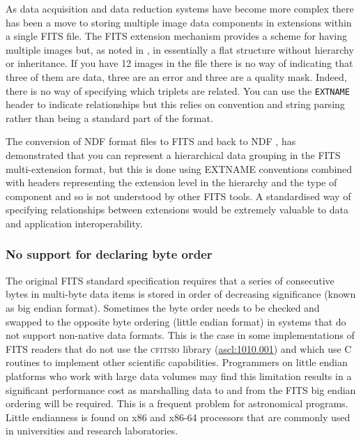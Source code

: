 \documentclass[final,authoryear,5p,times,twocolumn]{elsarticle}
\begin{document}
{{As data acquisition and data reduction systems have become more
complex there has been a move to storing multiple image data
components in extensions within a single FITS file. The FITS extension
mechanism provides a scheme for having multiple images but, as noted
in \citet{2003ASSL..285...71G}, in essentially a flat structure
without hierarchy or inheritance. If you have 12 images in the file
there is no way of indicating that three of them are data, three are an error
and three are a quality mask. Indeed, there is no way of specifying which
triplets are related. You can use the \texttt{EXTNAME} header to
indicate relationships but this relies on convention and string
parsing rather than being a standard part of the format.


The conversion of NDF format files to FITS and back to NDF
\citep{SUN55,1997STARB..19...14C}, has demonstrated that you can
represent a hierarchical data grouping in the FITS multi-extension
format, but this is done using EXTNAME conventions combined with
headers representing the extension level in the hierarchy and the type
of component and so is not understood by other FITS tools. A
standardised way of specifying relationships between extensions would
be extremely valuable to data and application interoperability.


\subsubsection{No support for declaring byte order}
\label{section_byte_order}

The original FITS standard specification \citep{1981A&AS...44..363W}
requires that a series of consecutive bytes in multi-byte data items is
stored in order of decreasing significance (known as big endian format).
Sometimes the byte order needs to be checked and swapped to the opposite
byte ordering (little endian format) in systems that do not support
non-native data formats.  This is the case in some implementations of FITS
readers that do not use the \textsc{cfitsio} library
(\href{http://ascl.net/1010.001}{ascl:1010.001}) and which use C routines
to implement other scientific capabilities.  Programmers on little endian
platforms who work with large data volumes may find this limitation
results in a significant performance cost as marshalling data to and from
the FITS big endian ordering will be required.  This is a frequent problem
for astronomical programs. Little endianness is found on x86 and x86-64
processors that are commonly used in universities and research
laboratories.


}}
\end{document}

